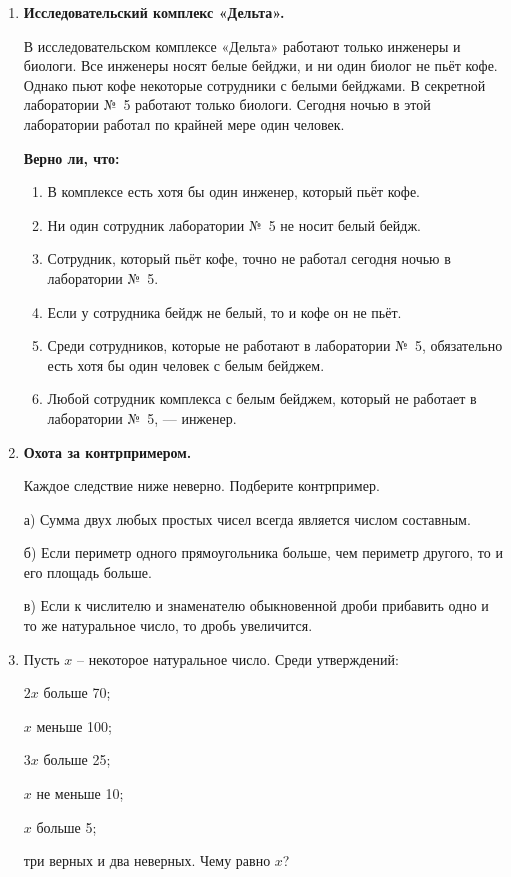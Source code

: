 \begin{enumerate}[itemsep=0.55em]
Здесь $a$, $b$ и $n$ — натуральные числа.

\newpage

\item \textbf{Исследовательский комплекс «Дельта».}

\begin{sloppypar}
В исследовательском комплексе «Дельта» работают только инженеры и
биологи. Все инженеры носят белые бейджи, и ни один биолог не пьёт кофе. Однако пьют кофе некоторые сотрудники с белыми бейджами. В секретной
лаборатории №~5 работают только биологи. 
Сегодня ночью в этой лаборатории работал по крайней мере один человек.
\end{sloppypar}

\textbf{Верно ли, что:}

\begin{enumerate}[label=\arabic*),itemsep=0.65em]
\item В комплексе есть хотя бы один инженер, который пьёт кофе.
\item Ни один сотрудник лаборатории №~5 не носит белый бейдж.
\item Сотрудник, который пьёт кофе, точно не работал сегодня ночью
в лаборатории №~5.
\item Если у сотрудника бейдж не белый, то и кофе он не пьёт.
\item Среди сотрудников, которые не работают в лаборатории №~5, обязательно
есть хотя бы один человек с белым бейджем.
\item Любой сотрудник комплекса с белым бейджем, который не работает
в лаборатории №~5, --- инженер.
\end{enumerate}

\item \textbf{Охота за контрпримером.}\par\vspace{0.15em}

Каждое следствие ниже неверно. Подберите контрпример.

а) Сумма двух любых простых чисел всегда является числом составным.

б) Если периметр одного прямоугольника больше, чем периметр другого, то и его площадь больше.

в) Если к числителю и знаменателю обыкновенной дроби прибавить одно и то же натуральное число, то дробь увеличится.

\item Пусть $x$ -- некоторое натуральное число. Среди утверждений:

$2x$ больше 70;

$x$ меньше 100;

$3x$ больше 25;

$x$ не меньше 10;

$x$ больше 5;

три верных и два неверных. Чему равно $x$?

\end{enumerate}
